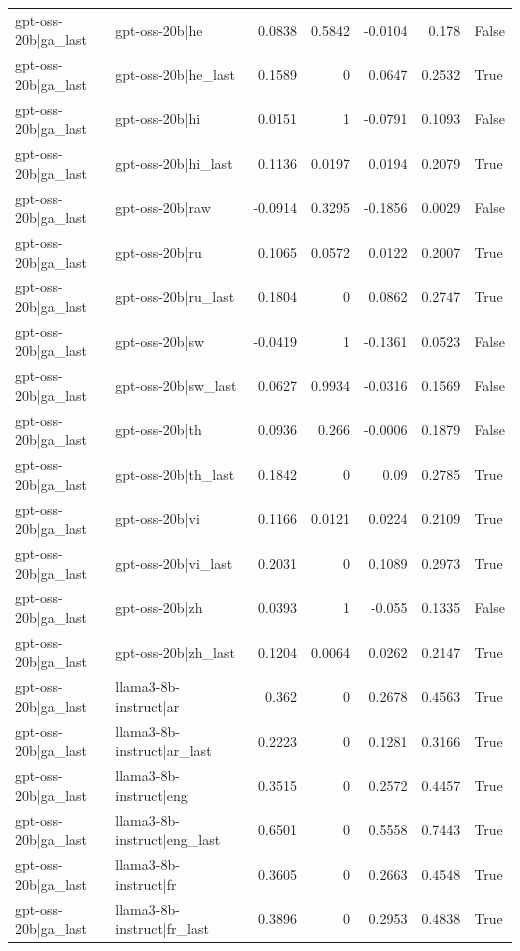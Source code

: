 \begin{table}
\begin{tabular}{l l r r r r l}
gpt-oss-20b|ga_last & gpt-oss-20b|he & 0.0838 & 0.5842 & -0.0104 & 0.178 & False \\
gpt-oss-20b|ga_last & gpt-oss-20b|he_last & 0.1589 & 0 & 0.0647 & 0.2532 & True \\
gpt-oss-20b|ga_last & gpt-oss-20b|hi & 0.0151 & 1 & -0.0791 & 0.1093 & False \\
gpt-oss-20b|ga_last & gpt-oss-20b|hi_last & 0.1136 & 0.0197 & 0.0194 & 0.2079 & True \\
gpt-oss-20b|ga_last & gpt-oss-20b|raw & -0.0914 & 0.3295 & -0.1856 & 0.0029 & False \\
gpt-oss-20b|ga_last & gpt-oss-20b|ru & 0.1065 & 0.0572 & 0.0122 & 0.2007 & True \\
gpt-oss-20b|ga_last & gpt-oss-20b|ru_last & 0.1804 & 0 & 0.0862 & 0.2747 & True \\
gpt-oss-20b|ga_last & gpt-oss-20b|sw & -0.0419 & 1 & -0.1361 & 0.0523 & False \\
gpt-oss-20b|ga_last & gpt-oss-20b|sw_last & 0.0627 & 0.9934 & -0.0316 & 0.1569 & False \\
gpt-oss-20b|ga_last & gpt-oss-20b|th & 0.0936 & 0.266 & -0.0006 & 0.1879 & False \\
gpt-oss-20b|ga_last & gpt-oss-20b|th_last & 0.1842 & 0 & 0.09 & 0.2785 & True \\
gpt-oss-20b|ga_last & gpt-oss-20b|vi & 0.1166 & 0.0121 & 0.0224 & 0.2109 & True \\
gpt-oss-20b|ga_last & gpt-oss-20b|vi_last & 0.2031 & 0 & 0.1089 & 0.2973 & True \\
gpt-oss-20b|ga_last & gpt-oss-20b|zh & 0.0393 & 1 & -0.055 & 0.1335 & False \\
gpt-oss-20b|ga_last & gpt-oss-20b|zh_last & 0.1204 & 0.0064 & 0.0262 & 0.2147 & True \\
gpt-oss-20b|ga_last & llama3-8b-instruct|ar & 0.362 & 0 & 0.2678 & 0.4563 & True \\
gpt-oss-20b|ga_last & llama3-8b-instruct|ar_last & 0.2223 & 0 & 0.1281 & 0.3166 & True \\
gpt-oss-20b|ga_last & llama3-8b-instruct|eng & 0.3515 & 0 & 0.2572 & 0.4457 & True \\
gpt-oss-20b|ga_last & llama3-8b-instruct|eng_last & 0.6501 & 0 & 0.5558 & 0.7443 & True \\
gpt-oss-20b|ga_last & llama3-8b-instruct|fr & 0.3605 & 0 & 0.2663 & 0.4548 & True \\
gpt-oss-20b|ga_last & llama3-8b-instruct|fr_last & 0.3896 & 0 & 0.2953 & 0.4838 & True \\

\end{tabular}
\end{table}
